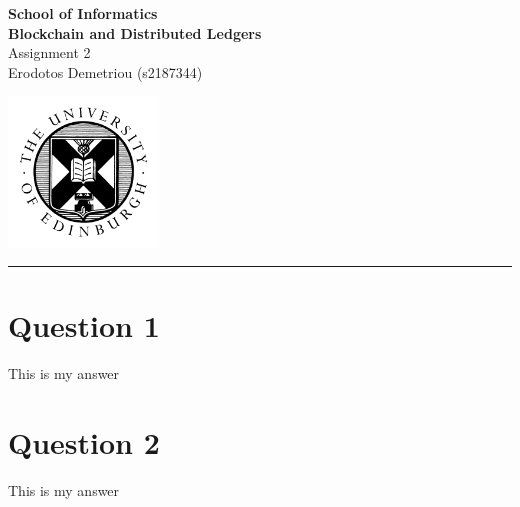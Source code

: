 \documentclass[11pt,a4paper]{article}
\begin{document}
\noindent
\begin{minipage}{120mm}
        {\huge {\bf School of Informatics}}\\
        {\Large {\bf Blockchain and Distributed Ledgers}}\\

        {\Large Assignment 2}\\
        {\normalsize Erodotos Demetriou (s2187344)}
\end{minipage}
\hfill
\begin{minipage}{40mm}              
        \includegraphics[width=40mm]{crest.png}
\end{minipage}

\begin{center}
\rule{\linewidth}{0.5mm}
\end{center}


\section*{Question 1}
This is my answer

\section*{Question 2}
This is my answer
\end{document}
